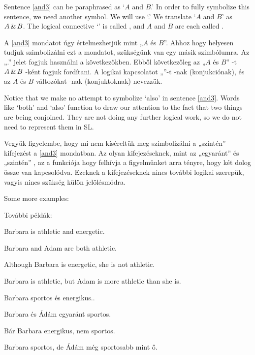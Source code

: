 Sentence \ref{and3} can be paraphrased as `$A$ and $B$.'
In order to fully symbolize this sentence, we need another symbol. We will use `\eand.' 
We translate `$A$ and $B$' as $A\,\&\, B$.
The logical connective `\eand' is called , and $A$ and $B$ are each called .


A \ref{and3} mondatot úgy értelmezhetjük mint „$A$ és $B$”. 
Ahhoz hogy helyesen tudjuk szimbolizálni ezt a mondatot, szükségünk van egy másik szimbólumra. Az „\eand.” jelet fogjuk használni a következőkben. 
Ebből következőleg az „$A$ és $B$” -t  $A\,\&\, B$ -ként fogjuk fordítani. 
A logikai kapcsolatot „\eand”-t -nak (konjukciónak), és az $A$ és $B$  változókat  -nak (konjuktoknak) nevezzük.



Notice that we make no attempt to symbolize `also' in sentence \ref{and3}.
Words like `both' and `also' function to draw our attention to the fact that two things are being conjoined. They are not doing any further logical work, so we do not need to represent them in SL.

Vegyük figyelembe, hogy mi nem kíséreltük meg szimbolizálni a „szintén” kifejezést a \ref{and3} mondatban.
Az olyan kifejezéseknek, mint az „egyaránt” és „szintén” , az a funkciója hogy felhívja a figyelmünket arra tényre, hogy két dolog össze van kapcsolódva.
Ezeknek a kifejezéseknek nincs további logikai szerepük, vagyis nincs szükség külön jelölésmódra.

Some more examples:

További példák:

\begin{earg}
\item[\ex{and4}]Barbara is athletic and energetic.
\item[\ex{and5}]Barbara and Adam are both athletic.
\item[\ex{and6}]Although Barbara is energetic, she is not athletic.
\item[\ex{and7}]Barbara is athletic, but Adam is more athletic than she is.
\end{earg}

\begin{earg}
\item[\ex{and4}]Barbara sportos és energikus..
\item[\ex{and5}]Barbara és Ádám egyaránt sportos.
\item[\ex{and6}]Bár Barbara energikus, nem sportos.
\item[\ex{and7}]Barbara sportos, de Ádám még sportosabb mint ő.
\end{earg}

